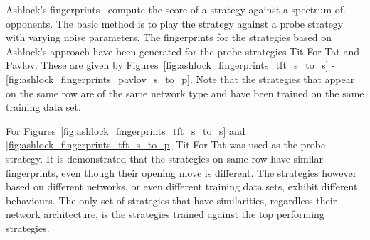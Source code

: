 Ashlock's fingerprints~\cite{Ashlock2005, Ashlock2008, Ashlock2009,
Ashlock2010, Ashlock2006a} compute the score of a strategy against a spectrum of.
opponents. The basic method is to play the strategy against a probe strategy
with varying noise parameters. The fingerprints for the \lstmstrategies
strategies based on Ashlock's approach have been generated for the probe
strategies Tit For Tat and Pavlov. These are given by
Figures~\ref{fig:ashlock_fingerprints_tft_s_to_s} -
\ref{fig:ashlock_fingerprints_pavlov_s_to_p}. Note that the strategies that
appear on the same row are of the same network type and have been trained on
the same training data set.

For Figures~\ref{fig:ashlock_fingerprints_tft_s_to_s} and
\ref{fig:ashlock_fingerprints_tft_s_to_p} Tit For Tat was used as the probe
strategy. It is demonstrated that the strategies on same row have similar fingerprints,
even though their opening move is different. The strategies however based on
different networks, or even different training data sets, exhibit different
behaviours. The only set of strategies that have similarities, regardless their
network architecture, is the strategies trained against the top performing
strategies.

